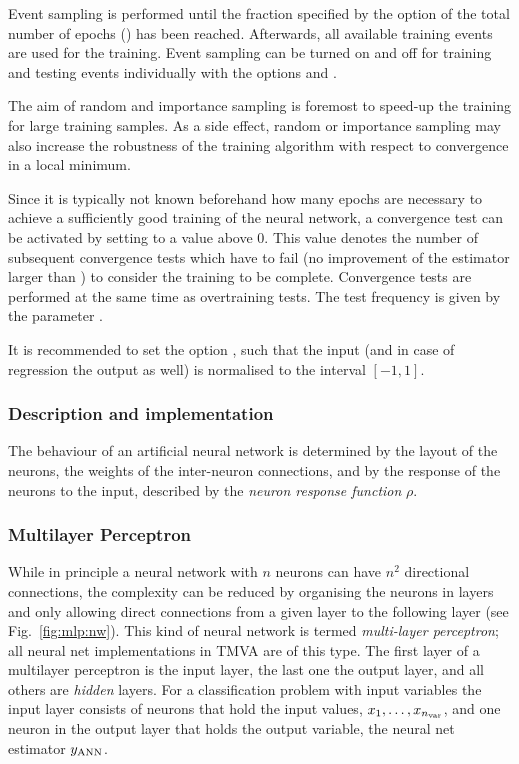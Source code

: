 Event sampling is performed until the fraction specified by the option
 of the total number of epochs () has been
reached. Afterwards, all available training events are used for the training.
Event sampling can be turned on and off for training and testing events
individually with the options  and .

The aim of random and importance sampling is foremost to speed-up the training
for large training samples. As a side effect, random or importance sampling may
also increase the robustness of the training algorithm with respect to convergence
in a local minimum.

Since it is typically not known beforehand how many epochs are necessary to
achieve a sufficiently good training of the neural network, a convergence test
can be activated by setting  to a value above 0. This
value denotes the number of subsequent convergence tests which have to fail
(\ie no improvement of the estimator larger than ) to
consider the training to be complete. Convergence tests are performed at the
same time as overtraining tests. The test frequency is given by the parameter
.

It is recommended to set the option , such that
the input (and in case of regression the output as well) is normalised to the
interval $[-1,1]$.

\subsubsection{Description and implementation}
\label{sec:mlp:impl}

The behaviour of an artificial neural network is determined by the layout of
the neurons, the weights of the inter-neuron connections, and by the
response of the neurons to the input, described by the {\em neuron
  response function} $\rho$.

\subsubsection*{Multilayer Perceptron}

While in principle a neural network with $n$ neurons can have $n^2$
directional connections, the complexity can be reduced by organising the
neurons in layers and only allowing direct connections from a given layer
to the following layer (see Fig.~\ref{fig:mlp:nw}). This kind of
neural network is termed {\em multi-layer perceptron}; all neural net
implementations in TMVA are of this type. The first layer of a multilayer perceptron
is the input layer, the last one the output layer, and all others are
{\em hidden} layers.  For a classification problem with \Nvar input
variables the input layer consists of \Nvar
neurons that hold the input values, $x_1,\dots,x_{n_\text{var}}$, and one
neuron in the output layer that holds the output variable, the neural
net estimator $ y_{\rm ANN}$.

